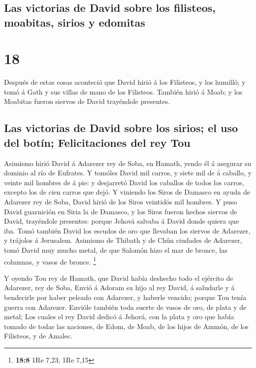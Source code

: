 \hypertarget{las-victorias-de-david-sobre-los-filisteos-moabitas-sirios-y-edomitas}{%
\subsection{Las victorias de David sobre los filisteos, moabitas, sirios
y
edomitas}\label{las-victorias-de-david-sobre-los-filisteos-moabitas-sirios-y-edomitas}}

\hypertarget{section-17}{%
\section{18}\label{section-17}}

 Después de estas cosas aconteció que David hirió á los
Filisteos, y los humilló; y tomó á Gath y sus villas de mano de los
Filisteos.  También hirió á Moab; y los Moabitas fueron
siervos de David trayéndole presentes.

\hypertarget{las-victorias-de-david-sobre-los-sirios-el-uso-del-botuxedn-felicitaciones-del-rey-tou}{%
\subsection{Las victorias de David sobre los sirios; el uso del botín;
Felicitaciones del rey
Tou}\label{las-victorias-de-david-sobre-los-sirios-el-uso-del-botuxedn-felicitaciones-del-rey-tou}}

 Asimismo hirió David á Adarezer rey de Soba, en Hamath,
yendo él á asegurar su dominio al río de Eufrates.  Y
tomóles David mil carros, y siete mil de á caballo, y veinte mil hombres
de á pie: y desjarretó David los caballos de todos los carros, excepto
los de cien carros que dejó.  Y viniendo los Siros de
Damasco en ayuda de Adarezer rey de Soba, David hirió de los Siros
veintidós mil hombres.  Y puso David guarnición en Siria
la de Damasco, y los Siros fueron hechos siervos de David, trayéndole
presentes: porque Jehová salvaba á David donde quiera que iba.
 Tomó también David los escudos de oro que llevaban los
siervos de Adarezer, y trájolos á Jerusalem.  Asimismo de
Thibath y de Chûn ciudades de Adarezer, tomó David muy mucho metal, de
que Salomón hizo el mar de bronce, las columnas, y vasos de bronce.
\footnote{\textbf{18:8} 1Re 7,23; 1Re 7,15}

 Y oyendo Tou rey de Hamath, que David había deshecho todo
el ejército de Adarezer, rey de Soba,  Envió á Adoram su
hijo al rey David, á saludarle y á bendecirle por haber peleado con
Adarezer, y haberle vencido; porque Tou tenía guerra con Adarezer.
Envióle también toda suerte de vasos de oro, de plata y de metal;
 Los cuales el rey David dedicó á Jehová, con la plata y
oro que había tomado de todas las naciones, de Edom, de Moab, de los
hijos de Ammón, de los Filisteos, y de Amalec.

